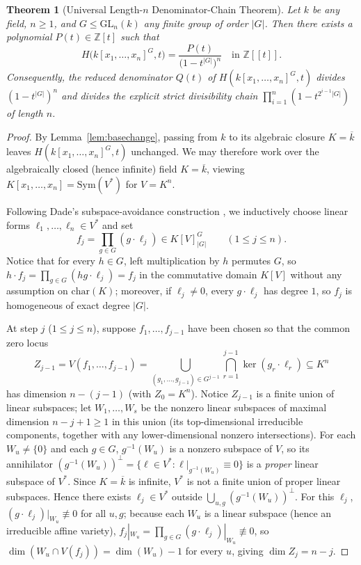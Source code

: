 \documentclass[11pt]{article}
\newtheorem{theorem}{Theorem}[section]
\theoremstyle{definition}
\theoremstyle{remark}
\begin{document}
\begin{theorem}[Universal Length-$n$ Denominator-Chain Theorem]
\label{thm:modular-main}
Let $k$ be any field, $n \ge 1$, and $G \le \mathrm{GL}_n(k)$ any finite group of order $|G|$. Then there exists a polynomial $P(t) \in \mathbb{Z}[t]$ such that
\[
H\bigl(k[x_1,\dots,x_n]^G, t\bigr) = \frac{P(t)}{\bigl(1 - t^{|G|}\bigr)^n} \quad \text{in } \mathbb{Z}[[t]].
\]
Consequently, the reduced denominator $Q(t)$ of $H(k[x_1,\dots,x_n]^G, t)$ divides $(1 - t^{|G|})^n$ and divides the explicit strict divisibility chain $\prod_{i=1}^{n} (1 - t^{2^{i-1}|G|})$ of length $n$.
\end{theorem}

\begin{proof}
By Lemma~\ref{lem:basechange}, passing from $k$ to its algebraic closure $K = \overline{k}$ leaves $H(k[x_1,\dots,x_n]^G, t)$ unchanged. We may therefore work over the algebraically closed (hence infinite) field $K = \overline{k}$, viewing $K[x_1,\dots,x_n] = \mathrm{Sym}(V^*)$ for $V = K^n$.

Following Dade's subspace-avoidance construction \cite[Proposition~3.3.1]{DerksenKemper}, we inductively choose linear forms $\ell_1,\dots,\ell_n \in V^*$ and set
\[
f_j = \prod_{g \in G} (g \cdot \ell_j) \in K[V]_{|G|}^G \qquad (1 \le j \le n).
\]
Notice that for every $h \in G$, left multiplication by $h$ permutes $G$, so $h \cdot f_j = \prod_{g \in G} (hg \cdot \ell_j) = f_j$ in the commutative domain $K[V]$ without any assumption on $\mathrm{char}(K)$; moreover, if $\ell_j \ne 0$, every $g \cdot \ell_j$ has degree $1$, so $f_j$ is homogeneous of exact degree $|G|$.

At step $j$ ($1 \le j \le n$), suppose $f_1,\dots,f_{j-1}$ have been chosen so that the common zero locus
\[
Z_{j-1} = V(f_1,\dots,f_{j-1}) = \bigcup_{(g_1,\dots,g_{j-1}) \in G^{j-1}} \bigcap_{r=1}^{j-1} \ker(g_r \cdot \ell_r) \subseteq K^n
\]
has dimension $n - (j - 1)$ (with $Z_0 = K^n$). Notice $Z_{j-1}$ is a finite union of linear subspaces; let $W_1,\dots,W_s$ be the nonzero linear subspaces of maximal dimension $n - j + 1 \ge 1$ in this union (its top-dimensional irreducible components, together with any lower-dimensional nonzero intersections). For each $W_u \ne \{0\}$ and each $g \in G$, $g^{-1}(W_u)$ is a nonzero subspace of $V$, so its annihilator $(g^{-1}(W_u))^{\perp} = \{\ell \in V^* : \ell|_{g^{-1}(W_u)} \equiv 0\}$ is a \emph{proper} linear subspace of $V^*$. Since $K = \overline{k}$ is infinite, $V^*$ is not a finite union of proper linear subspaces. Hence there exists $\ell_j \in V^*$ outside $\bigcup_{u,g} (g^{-1}(W_u))^{\perp}$. For this $\ell_j$, $(g \cdot \ell_j)|_{W_u} \not\equiv 0$ for all $u, g$; because each $W_u$ is a linear subspace (hence an irreducible affine variety), $f_j|_{W_u} = \prod_{g \in G} (g \cdot \ell_j)|_{W_u} \not\equiv 0$, so $\dim(W_u \cap V(f_j)) = \dim(W_u) - 1$ for every $u$, giving $\dim Z_j = n - j$.


\end{proof}
\end{document}
